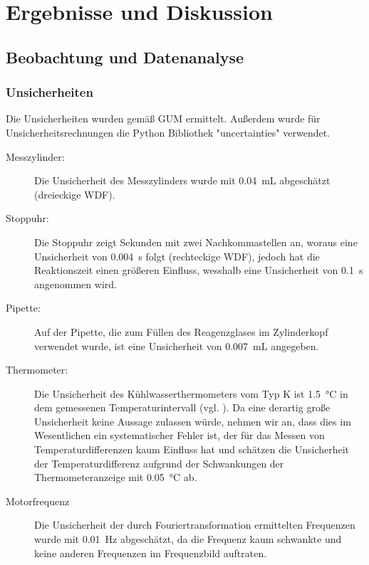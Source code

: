 \documentclass[
	a4paper,
	12pt,
	pagesize,
	ngerman
]{scrartcl}
\begin{document}
	\section{Ergebnisse und Diskussion}
	

	\subsection{Beobachtung und Datenanalyse}
	
	\subsubsection{Unsicherheiten} 
	Die Unsicherheiten wurden gemäß GUM ermittelt. 
	Außerdem wurde für Unsicherheitsrechnungen die Python Bibliothek "uncertainties" verwendet.
	\begin{description}
		\item[Messzylinder:] Die Unsicherheit des Messzylinders wurde mit \SI{0,04}{mL} abgeschätzt (dreieckige WDF).
		\item[Stoppuhr:] Die Stoppuhr zeigt Sekunden mit zwei Nachkommastellen an, woraus eine Unsicherheit von \SI{0,004}{s} folgt (rechteckige WDF), jedoch hat die Reaktionszeit einen größeren Einfluss, wesshalb eine Unsicherheit von \SI{0,1}{s} angenommen wird. 
		\item[Pipette:] Auf der Pipette, die zum Füllen des Reagenzglases im Zylinderkopf verwendet wurde, ist eine Unsicherheit von \SI{0,007}{mL} angegeben.
		\item[Thermometer:] Die Unsicherheit des Kühlwasserthermometers vom Typ K ist \SI{1,5}{\degreeCelsius} in dem gemessenen Temperaturintervall (vgl. \cite{DIN}). Da eine derartig große Unsicherheit keine Aussage zulassen würde, nehmen wir an, dass dies im Wesentlichen ein systematischer Fehler ist, der  für das Messen von Temperaturdifferenzen kaum Einfluss hat und schätzen die Unsicherheit der Temperaturdifferenz aufgrund der Schwankungen der Thermometeranzeige mit \SI{0,05}{\degreeCelsius} ab. 
		\item[Motorfrequenz] Die Unsicherheit der durch Fouriertransformation ermittelten Frequenzen wurde mit \SI{0,01}{Hz} abgeschätzt, da die Frequenz kaum schwankte und keine anderen Frequenzen im Frequenzbild auftraten.
	
	\end{description}
\end{document}
